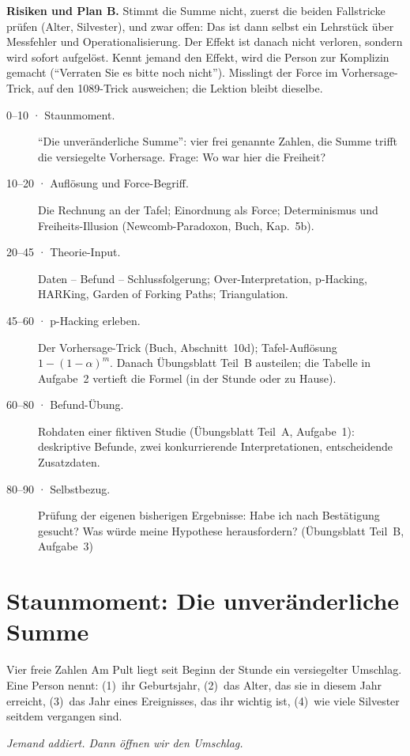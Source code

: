 \begin{vorbereitung}
\textbf{Risiken und Plan B.} Stimmt die Summe nicht, zuerst die beiden
Fallstricke prüfen (Alter, Silvester), und zwar offen: Das ist dann
selbst ein Lehrstück über Messfehler und Operationalisierung. Der Effekt
ist danach nicht verloren, sondern wird sofort aufgelöst. Kennt jemand
den Effekt, wird die Person zur Komplizin gemacht (\enquote{Verraten Sie
es bitte noch nicht}). Misslingt der Force im Vorhersage-Trick, auf den
1089-Trick ausweichen; die Lektion bleibt dieselbe.
\end{vorbereitung}

\begin{ablauf}
\begin{description}
\item[0--10 · Staunmoment.] \enquote{Die unveränderliche Summe}: vier frei
  genannte Zahlen, die Summe trifft die versiegelte Vorhersage. Frage: Wo
  war hier die Freiheit?
\item[10--20 · Auflösung und Force-Begriff.] Die Rechnung an der Tafel;
  Einordnung als Force; Determinismus und Freiheits-Illusion
  (Newcomb-Paradoxon, Buch, Kap.~5b).
\item[20--45 · Theorie-Input.] Daten -- Befund -- Schlussfolgerung;
  Over-Interpretation, p-Hacking, HARKing, Garden of Forking Paths;
  Triangulation.
\item[45--60 · p-Hacking erleben.] Der Vorhersage-Trick (Buch,
  Abschnitt~10d); Tafel-Auflösung $1-(1-\alpha)^m$. Danach Übungsblatt
  Teil~B austeilen; die Tabelle in Aufgabe~2 vertieft die Formel (in der
  Stunde oder zu Hause).
\item[60--80 · Befund-Übung.] Rohdaten einer fiktiven Studie (Übungsblatt
  Teil~A, Aufgabe~1): deskriptive Befunde, zwei konkurrierende Interpretationen,
  entscheidende Zusatzdaten.
\item[80--90 · Selbstbezug.] Prüfung der eigenen bisherigen Ergebnisse:
  Habe ich nach Bestätigung gesucht? Was würde meine Hypothese
  herausfordern? (Übungsblatt Teil~B, Aufgabe~3)
\end{description}
\end{ablauf}

\section{Staunmoment: Die unveränderliche Summe}
\begin{staunbox}{Vier freie Zahlen}
Am Pult liegt seit Beginn der Stunde ein versiegelter Umschlag. Eine
Person nennt:
(1)~ihr Geburtsjahr, (2)~das Alter, das sie in diesem Jahr erreicht,
(3)~das Jahr eines Ereignisses, das ihr wichtig ist, (4)~wie viele
Silvester seitdem vergangen sind.

\emph{Jemand addiert. Dann öffnen wir den Umschlag.}
\end{staunbox}
\os{\newpage}


